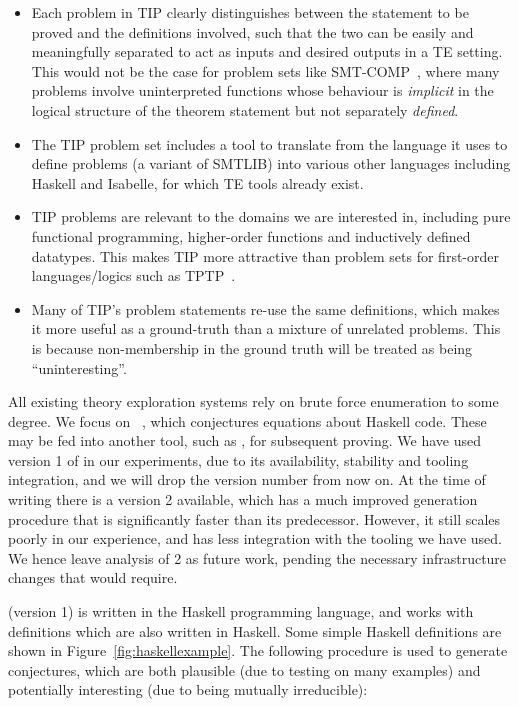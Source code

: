 \begin{itemize}
\item Each problem in TIP clearly distinguishes between the statement to be
  proved and the definitions involved, such that the two can be easily and
  meaningfully separated to act as inputs and desired outputs in a TE setting.
  This would not be the case for problem sets like
  SMT-COMP~\cite{barrett2005smt}, where many problems involve uninterpreted
  functions whose behaviour is \emph{implicit} in the logical structure of the
  theorem statement but not separately \emph{defined}.
\item The TIP problem set includes a tool to translate from the language it
  uses to define problems (a variant of SMTLIB) into various other languages
  including Haskell and Isabelle, for which TE tools already exist.
\item TIP problems are relevant to the domains we are interested in, including
  pure functional programming, higher-order functions and inductively defined
  datatypes. This makes TIP more attractive than problem sets for first-order
  languages/logics such as TPTP~\cite{sutcliffe2009tptp}.
\item Many of TIP's problem statements re-use the same definitions, which makes
  it more useful as a ground-truth than a mixture of unrelated problems. This is
  because non-membership in the ground truth will be treated as being
  ``uninteresting''.
\end{itemize}

All existing theory exploration systems rely on brute force enumeration to some
degree. We focus on \qspec{}~\cite{QuickSpec}, which conjectures equations about
Haskell code. These may be fed into another tool, such as \hspec{}, for
subsequent proving. We have used version 1 of \qspec{} in our experiments, due
to its availability, stability and tooling integration, and we will drop the
version number from now on. At the time of writing there is a \qspec{} version 2
available, which has a much improved generation procedure that is significantly
faster than its predecessor. However, it still scales poorly in our experience,
and has less integration with the tooling we have used. We hence leave analysis
of \qspec{} 2 as future work, pending the necessary infrastructure changes that
would require.

\qspec{} (version 1) is written in the Haskell programming language, and works
with definitions which are also written in Haskell. Some simple Haskell
definitions are shown in Figure~\ref{fig:haskellexample}. The following
procedure is used to generate conjectures, which are both plausible (due to
testing on many examples) and potentially interesting (due to being mutually
irreducible):

